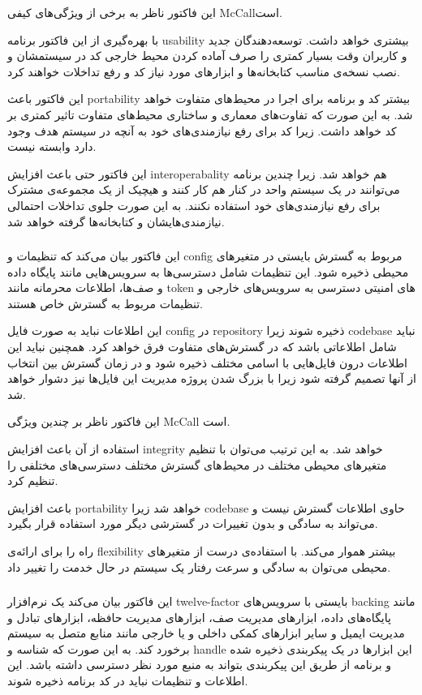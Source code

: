 این فاکتور ناظر به برخی از ویژگی‌های کیفی McCallاست.

با بهره‌گیری از این فاکتور برنامه usability بیشتری خواهد داشت.
توسعه‌دهندگان جدید و کاربران وقت بسیار کمتری را صرف آماده کردن محیط خارجی کد در سیستمشان و نصب نسخه‌ی مناسب کتابخانه‌ها و ابزار‌های مورد  نیاز کد و رفع تداخلات خواهند کرد.

این فاکتور باعث portability بیشتر کد و برنامه برای اجرا در محیط‌های متفاوت خواهد شد. به این صورت که تفاوت‌های معماری و ساختاری محیط‌های متفاوت تاثیر کمتری بر کد خواهد داشت. زیرا کد برای رفع نیازمندی‌های خود به آنچه در سیستم هدف وجود دارد وابسته نیست.

این فاکتور حتی باعث افزایش interoperabality هم خواهد شد. زیرا چندین برنامه می‌توانند در یک سیستم واحد در کنار هم کار کنند و هیچیک از یک مجموعه‌ی مشترک برای رفع نیازمندی‌های خود استفاده نکنند. به این صورت جلوی تداخلات احتمالی نیازمندی‌هایشان و کتابخانه‌ها گرفته خواهد شد.


\subsubsection{}
این فاکتور بیان می‌کند که تنظیمات و config مربوط به گسترش بایستی در متغیر‌های محیطی 
ذخیره شود. این تنظیمات شامل دسترسی‌ها به سرویس‌هایی مانند پایگاه داده و صف‌ها، اطلاعات محرمانه مانند token های امنیتی دسترسی به سرویس‌های خارجی و تنظیمات مربوط به گسترش خاص هستند.

این اطلاعات نباید به صورت 
فایل‌ config در repository ذخیره شوند زیرا codebase نباید شامل اطلاعاتی باشد که در گسترش‌های متفاوت فرق خواهد کرد. همچنین نباید این اطلاعات درون فایل‌هایی با اسامی مختلف ذخیره شود و در زمان گسترش بین انتخاب از آنها تصمیم گرفته شود زیرا با بزرگ شدن پروژه مدیریت این فایل‌ها نیز دشوار خواهد شد.

این فاکتور ناظر بر چندین ویژگی McCall است.

استفاده از آن باعث افزایش 
integrity
خواهد شد. به این ترتیب می‌توان با تنظیم متغیر‌های محیطی مختلف در محیط‌های گسترش مختلف دسترسی‌های مختلفی را تنظیم کرد.

باعث افزایش portability خواهد شد زیرا codebase حاوی اطلاعات گسترش نیست و می‌تواند به سادگی و بدون تغییرات در گسترشی دیگر مورد استفاده قرار بگیرد.

راه را برای ارائه‌ی flexibility بیشتر هموار می‌کند. با استفاده‌ی درست از متغیر‌های محیطی می‌توان به سادگی و سرعت رفتار یک سیستم در حال خدمت را  تغییر داد.


\subsubsection{}
این فاکتور بیان می‌کند یک نرم‌افزار 
twelve-factor
بایستی با سرویس‌های backing مانند پایگا‌ه‌های داده، ابزار‌های مدیریت صف، ابزار‌های مدیریت حافظه، ابزار‌های تبادل و مدیریت ایمیل و سایر ابزار‌های کمکی داخلی و یا خارجی مانند منابع متصل به سیستم برخورد کند. به این صورت که شناسه و handle این ابزار‌ها در یک پیکربندی ذخیره شده و برنامه از طریق این پیکربندی بتواند به منبع مورد نظر دسترسی داشته باشد. این اطلاعات و تنظیمات نباید در کد برنامه ذخیره شوند.

